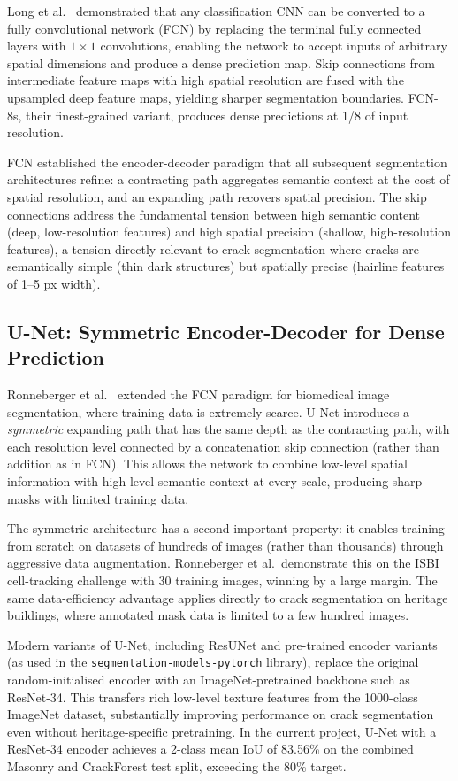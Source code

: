 \documentclass[12pt,a4paper]{article}
\begin{document}
Long et al.~\cite{long2015fully} demonstrated that any classification CNN can be converted to a fully convolutional network (FCN) by replacing the terminal fully connected layers with $1\times1$ convolutions, enabling the network to accept inputs of arbitrary spatial dimensions and produce a dense prediction map. Skip connections from intermediate feature maps with high spatial resolution are fused with the upsampled deep feature maps, yielding sharper segmentation boundaries. FCN-8s, their finest-grained variant, produces dense predictions at 1/8 of input resolution.

FCN established the encoder-decoder paradigm that all subsequent segmentation architectures refine: a contracting path aggregates semantic context at the cost of spatial resolution, and an expanding path recovers spatial precision. The skip connections address the fundamental tension between high semantic content (deep, low-resolution features) and high spatial precision (shallow, high-resolution features), a tension directly relevant to crack segmentation where cracks are semantically simple (thin dark structures) but spatially precise (hairline features of 1--5 px width).

\subsection{U-Net: Symmetric Encoder-Decoder for Dense Prediction}

Ronneberger et al.~\cite{ronneberger2015unet} extended the FCN paradigm for biomedical image segmentation, where training data is extremely scarce. U-Net introduces a \textit{symmetric} expanding path that has the same depth as the contracting path, with each resolution level connected by a concatenation skip connection (rather than addition as in FCN). This allows the network to combine low-level spatial information with high-level semantic context at every scale, producing sharp masks with limited training data.

The symmetric architecture has a second important property: it enables training from scratch on datasets of hundreds of images (rather than thousands) through aggressive data augmentation. Ronneberger et al.\ demonstrate this on the ISBI cell-tracking challenge with 30 training images, winning by a large margin. The same data-efficiency advantage applies directly to crack segmentation on heritage buildings, where annotated mask data is limited to a few hundred images.

Modern variants of U-Net, including ResUNet \cite{zhang2018road} and pre-trained encoder variants (as used in the \texttt{segmentation-models-pytorch} library), replace the original random-initialised encoder with an ImageNet-pretrained backbone such as ResNet-34. This transfers rich low-level texture features from the 1000-class ImageNet dataset, substantially improving performance on crack segmentation even without heritage-specific pretraining. In the current project, U-Net with a ResNet-34 encoder achieves a 2-class mean IoU of 83.56\% on the combined Masonry and CrackForest test split, exceeding the 80\% target.
\end{document}
